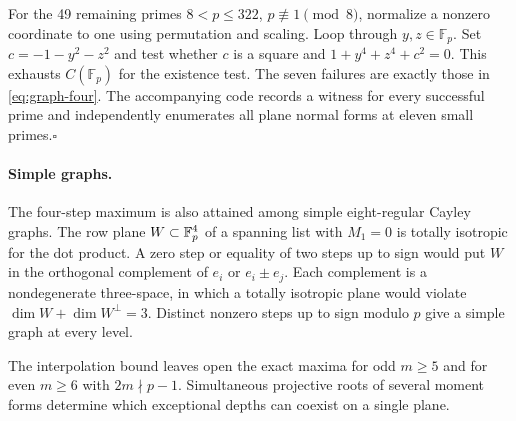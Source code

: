 For the 49 remaining primes $8<p\le322$, $p\not\equiv1\pmod8$, normalize a nonzero coordinate to one using permutation and scaling. Loop through $y,z\in\mathbb F_p$. Set $c=-1-y^2-z^2$ and test whether $c$ is a square and $1+y^4+z^4+c^2=0$. This exhausts $C(\mathbb F_p)$ for the existence test. The seven failures are exactly those in \eqref{eq:graph-four}. The accompanying code records a witness for every successful prime and independently enumerates all plane normal forms at eleven small primes.\hfill$\square$

\paragraph{Simple graphs.} The four-step maximum is also attained among simple eight-regular Cayley graphs. The row plane $W\subset\mathbb F_p^4$ of a spanning list with $M_1=0$ is totally isotropic for the dot product. A zero step or equality of two steps up to sign would put $W$ in the orthogonal complement of $e_i$ or $e_i\pm e_j$. Each complement is a nondegenerate three-space, in which a totally isotropic plane would violate $\dim W+\dim W^\perp=3$. Distinct nonzero steps up to sign modulo $p$ give a simple graph at every level.

The interpolation bound leaves open the exact maxima for odd $m\ge5$ and for even $m\ge6$ with $2m\nmid p-1$. Simultaneous projective roots of several moment forms determine which exceptional depths can coexist on a single plane.
